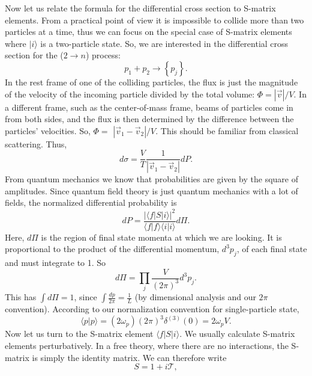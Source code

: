 \documentclass[aps,prb,superscriptaddress,nofootinbib]{revtex4}
\begin{document}
Now let us relate the formula for the differential cross section to S-matrix elements. 
From a practical point of view it is impossible to collide more than two particles at a time, thus we can focus on the special case of S-matrix elements where $|i\rangle$ is a two-particle state. 
So, we are interested in the differential cross section for the ($2 \rightarrow n$) process:
\begin{equation}
	p_{1}+p_{2} \rightarrow\left\{p_{j}\right\}.
\end{equation}
In the rest frame of one of the colliding particles, the flux is just the magnitude of the velocity of the incoming particle divided by the total volume: $\Phi=|\vec{v}| / V$. 
In a different frame, such as the center-of-mass frame, beams of particles come in from both sides, and the flux is then determined by the difference between the particles' velocities. 
So, $\Phi=$ $\left|\vec{v}_{1}-\vec{v}_{2}\right| / V$. 
This should be familiar from classical scattering. 
Thus,
\begin{equation}
	d \sigma=\frac{V}{T} \frac{1}{\left|\vec{v}_{1}-\vec{v}_{2}\right|} d P.
\end{equation}
From quantum mechanics we know that probabilities are given by the square of amplitudes. 
Since quantum field theory is just quantum mechanics with a lot of fields, the normalized differential probability is
\begin{equation}
	dP=\frac{|\langle f|S| i\rangle|^{2}}{\langle f | f\rangle\langle i | i\rangle} d \Pi.
\end{equation}
Here, $d \Pi$ is the region of final state momenta at which we are looking. 
It is proportional to the product of the differential momentum, $d^{3} p_{j}$, of each final state and must integrate to 1. 
So
\begin{equation}
	d \Pi=\prod_{j} \frac{V}{(2 \pi)^{3}} d^{3} p_{j}.
\end{equation}
This has $\int d \Pi=1$, since $\int \frac{d p}{2 \pi}=\frac{1}{L}$ (by dimensional analysis and our $2 \pi$ convention).
According to our normalization convention for single-particle state,
\begin{equation}
	\langle p|p\rangle = (2\omega_p)(2\pi)^3\delta^{(3)}(0) = 2\omega_p V.
\end{equation}
Now let us turn to the S-matrix element $\langle f|S| i\rangle$. 
We usually calculate S-matrix elements perturbatively. 
In a free theory, where there are no interactions, the S-matrix is simply the identity matrix. 
We can therefore write
\begin{equation}
	S=1+i \mathcal{T},
\end{equation}
\end{document}
